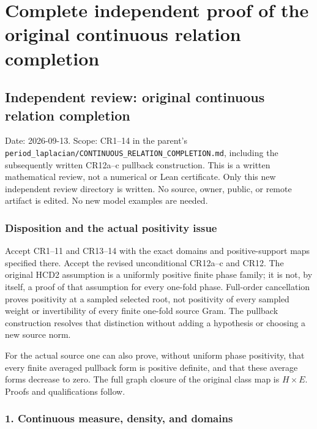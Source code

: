 \begingroup

\section{Complete independent proof of the original continuous relation completion}


\subsection{Independent review: original continuous relation completion}\label{independent-review-original-continuous-relation-completion}

Date: 2026-09-13. Scope: CR1--14 in the parent's \nolinkurl{period_laplacian/CONTINUOUS_RELATION_COMPLETION.md}, including the subsequently written CR12a--c pullback construction. This is a written mathematical review, not a numerical or Lean certificate. Only this new independent review directory is written. No source, owner, public, or remote artifact is edited. No new model examples are needed.

\subsubsection{Disposition and the actual positivity issue}\label{disposition-and-the-actual-positivity-issue}

Accept CR1--11 and CR13--14 with the exact domains and positive-support maps specified there. Accept the revised unconditional CR12a--c and CR12. The original HCD2 assumption is a uniformly positive finite phase family; it is not, by itself, a proof of that assumption for every one-fold phase. Full-order cancellation proves positivity at a sampled selected root, not positivity of every sampled weight or invertibility of every finite one-fold source Gram. The pullback construction resolves that distinction without adding a hypothesis or choosing a new source norm.

For the actual source one can also prove, without uniform phase positivity, that every finite averaged pullback form is positive definite, and that these average forms decrease to zero. The full graph closure of the original class map is \(H\times E\). Proofs and qualifications follow.

\subsubsection{1. Continuous measure, density, and domains}\label{continuous-measure-density-and-domains}

